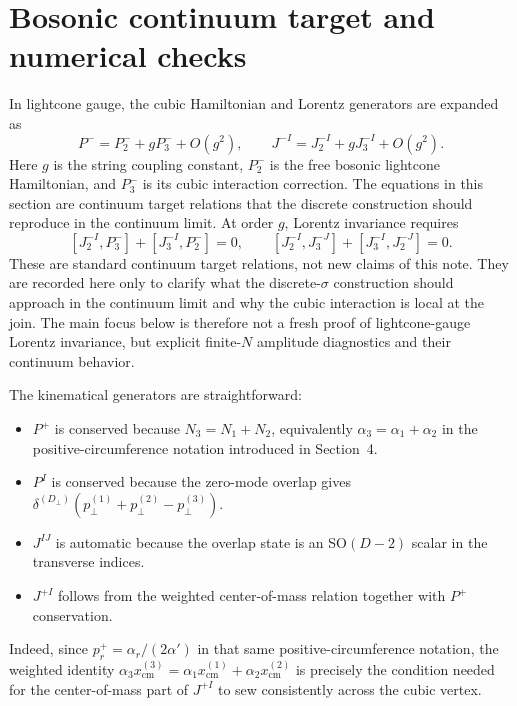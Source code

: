 \documentclass[11pt]{article}
\numberwithin{equation}{section}
\newcommand{\perpD}{D_\perp}
\begin{document}
\section{Bosonic continuum target and numerical checks}
In lightcone gauge, the cubic Hamiltonian and Lorentz generators are expanded as
\begin{equation}
\label{eq:s12-001}
P^- = P^-_2 + g P^-_3 + O(g^2),
\qquad
J^{-I} = J^{-I}_2 + g J^{-I}_3 + O(g^2).
\end{equation}
Here $g$ is the string coupling constant, $P^-_2$ is the free bosonic lightcone Hamiltonian, and $P^-_3$ is its cubic interaction correction. The equations in this section are continuum target relations that the discrete construction should reproduce in the continuum limit.
At order $g$, Lorentz invariance requires
\begin{equation}
\label{eq:s12-002}
[J^{-I}_2,P^-_3] + [J^{-I}_3,P^-_2] = 0,
\qquad
[J^{-I}_2,J^{-J}_3] + [J^{-I}_3,J^{-J}_2] = 0.
\end{equation}
These are standard continuum target relations, not new claims of this note. They are recorded here only to clarify what the discrete-$\sigma$ construction should approach in the continuum limit and why the cubic interaction is local at the join. The main focus below is therefore not a fresh proof of lightcone-gauge Lorentz invariance, but explicit finite-$N$ amplitude diagnostics and their continuum behavior.

The kinematical generators are straightforward:
\begin{itemize}
\item $P^+$ is conserved because $N_3=N_1+N_2$, equivalently $\alpha_3=\alpha_1+\alpha_2$ in the positive-circumference notation introduced in Section~4.
\item $P^I$ is conserved because the zero-mode overlap gives $\delta^{(\perpD)}(p_\perp^{(1)}+p_\perp^{(2)}-p_\perp^{(3)})$.
\item $J^{IJ}$ is automatic because the overlap state is an SO$(D-2)$ scalar in the transverse indices.
\item $J^{+I}$ follows from the weighted center-of-mass relation together with $P^+$ conservation.
\end{itemize}
Indeed, since $p_r^+=\alpha_r/(2\alpha')$ in that same positive-circumference notation, the weighted identity $\alpha_3 x_{\mathrm{cm}}^{(3)}=\alpha_1 x_{\mathrm{cm}}^{(1)}+\alpha_2 x_{\mathrm{cm}}^{(2)}$ is precisely the condition needed for the center-of-mass part of $J^{+I}$ to sew consistently across the cubic vertex.
\end{document}
